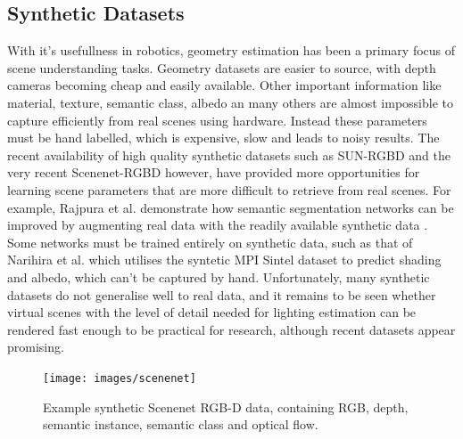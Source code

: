 \documentclass[ %
                    author={Gavin Parker},
                supervisor={Dr. Neill Campbell},
                    degree={MEng},
                     title={Deep Siamese Networks for Illumination Estimation from Stereo Images},
                  subtitle={},
                      type={research},
                      year={2018} ]{dissertation}
\begin{document}
\subsection{Synthetic Datasets}
With it's usefullness in robotics, geometry estimation has been a primary focus of scene understanding tasks. Geometry datasets are easier to source, with depth cameras becoming cheap and easily available. Other important information like material, texture, semantic class, albedo an many others are almost impossible to capture efficiently from real scenes using hardware. Instead these parameters must be hand labelled, which is expensive, slow and leads to noisy results. The recent availability of high quality synthetic datasets such as SUN-RGBD \cite{song2015sun} and the very recent Scenenet-RGBD \cite{McCormac:etal:arXiv2016} however, have provided more opportunities for learning scene parameters that are more difficult to retrieve from real scenes. For example, Rajpura et al. demonstrate how semantic segmentation networks can be improved by augmenting real data with the readily available synthetic data \cite{DBLP:journals/corr/abs-1709-00849}. Some networks must be trained entirely on synthetic data, such as that of Narihira et al. which utilises the syntetic MPI Sintel dataset to predict shading and albedo, which can't be captured by hand. Unfortunately, many synthetic datasets do not generalise well to real data, and it remains to be seen whether virtual scenes with the level of detail needed for lighting estimation can be rendered fast enough to be practical for research, although recent datasets appear promising.
\begin{figure}[H]
\centering
\texttt{[image: images/scenenet]}
\caption{Example synthetic Scenenet RGB-D data, containing RGB, depth, semantic instance, semantic class and optical flow.}
\end{figure}
\end{document}
